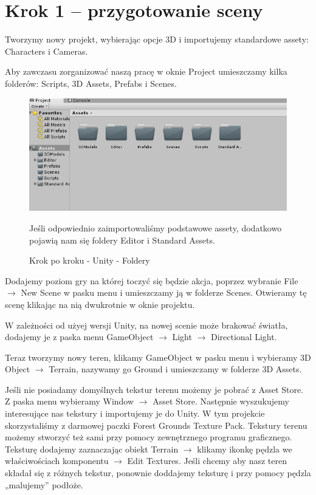 \documentclass[12pt]{xmgr}
\begin{document}
\section{Krok 1 – przygotowanie sceny}


Tworzymy nowy projekt, wybierając opcje 3D i importujemy standardowe assety: Characters i Cameras.

Aby zawczasu zorganizować naszą pracę w oknie Project umieszczamy kilka folderów: Scripts, 3D Assets, Prefabs  i Scenes.

\begin{figure}[!htb]
    \begin{center}
    \includegraphics[scale=0.25]{Screeny/UnityKrokPoKroku/foldery}
    \end{center}
    \caption{Krok po kroku - Unity - Foldery}
Jeśli odpowiednio zaimportowaliśmy podstawowe assety, dodatkowo pojawią nam się foldery Editor i Standard Assets.
\end{figure}

Dodajemy poziom gry na której toczyć się będzie akcja, poprzez wybranie File $\rightarrow$ New Scene w pasku menu i umieszczamy ją w folderze Scenes. Otwieramy tę scenę klikając na nią dwukrotnie w oknie projektu.

W zależności od użyej wersji Unity, na nowej scenie może brakować światła, dodajemy je z paska menu GameObject $\rightarrow$ Light $\rightarrow$ Directional Light.

Teraz tworzymy nowy teren, klikamy GameObject w pasku menu i wybieramy 3D Object $\rightarrow$ Terrain, nazywamy go Ground i umieszczamy w folderze 3D Assets.

Jeśli nie posiadamy domyślnych tekstur terenu możemy je pobrać z Asset Store. Z paska menu wybieramy Window $\rightarrow$ Asset Store. Następnie wyszukujemy interesujące nas tekstury i importujemy je do Unity. W tym projekcie skorzystaliśmy z darmowej paczki Forest Grounds Texture Pack. Tekstury terenu możemy stworzyć też sami przy pomocy zewnętrznego programu graficznego. Teksturę dodajemy zaznaczając obiekt Terrain $\rightarrow$ klikamy ikonkę pędzla we właściwościach komponentu $\rightarrow$ Edit Textures. Jeśli chcemy aby nasz teren składał się z różnych tekstur, ponownie doddajemy teksturę i przy pomocy pędzla „malujemy” podłoże.
\end{document}
